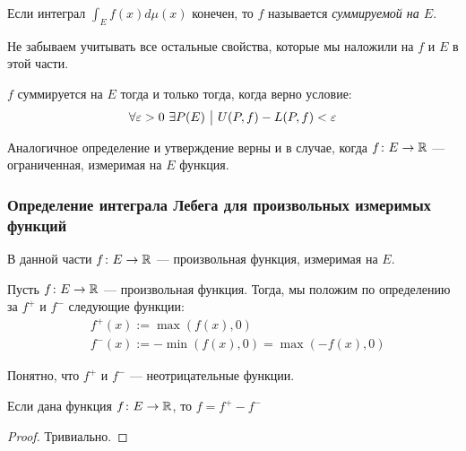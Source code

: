 \begin{definition}
	Если интеграл $\int_E f(x)d\mu(x)$ конечен, то $f$ называется \textit{суммируемой на $E$}.
\end{definition}

\begin{anote}
	Не забываем учитывать все остальные свойства, которые мы наложили на $f$ и $E$ в этой части.
\end{anote}

\begin{proposition}
	$f$ суммируется на $E$ тогда и только тогда, когда верно условие:
	\[
		\forall \varepsilon > 0\ \exists P(E) \ \big|\  U(P, f) - L(P, f) < \varepsilon
	\]
\end{proposition}

\begin{note}
	Аналогичное определение и утверждение верны и в случае, когда $f \colon E \to \mathbb{R}$ --- ограниченная, измеримая на $E$ функция.
\end{note}

\subsubsection*{Определение интеграла Лебега для произвольных измеримых функций}

\begin{note}
	В данной части $f \colon E \to \mathbb{R}$ --- произвольная функция, измеримая на $E$.
\end{note}

\begin{definition}
	Пусть $f \colon E \to \mathbb{R}$ --- произвольная функция. Тогда, мы положим по определению за $f^+$ и $f^-$ следующие функции:
	\begin{align*}
		&{f^+(x) := \max(f(x), 0)}
		\\
		&{f^-(x) := -\min(f(x), 0) = \max(-f(x), 0)}
	\end{align*}
\end{definition}

\begin{note}
	Понятно, что $f^+$ и $f^-$ --- неотрицательные функции.
\end{note}

\begin{proposition}
	Если дана функция $f \colon E \to \mathbb{R}$, то $f = f^+ - f^-$
\end{proposition}

\begin{proof}
	Тривиально.
\end{proof}


